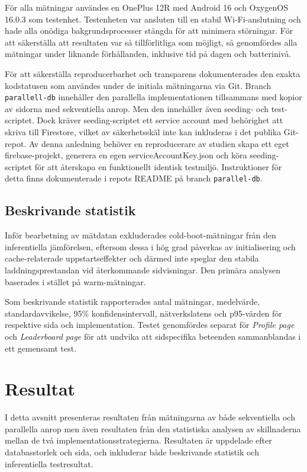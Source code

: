 \documentclass[letterpaper,twocolumn,10pt]{article}
\begin{document}
För alla mätningar användes en OnePlus 12R med Android 16 och OxygenOS 16.0.3
som testenhet. Testenheten var ansluten till en stabil Wi-Fi-anslutning och hade
alla onödiga bakgrundsprocesser stängda för att minimera störningar. För att
säkerställa att resultaten var så tillförlitliga som möjligt, så genomfördes
alla mätningar under liknande förhållanden, inklusive tid på dagen och
batterinivå. 

För att säkerställa reproducerbarhet och transparens dokumenterades den exakta
kodstatusen som användes under de initiala mätningarna via Git. Branch
\texttt{parallell-db} innehåller den parallella implementationen tillsammans med
kopior av sidorna med sekventiella anrop. Men den innehåller även seeding- och
test-scriptet. Dock kräver seeding-scriptet ett service account med behörighet
att skriva till Firestore, vilket av säkerhetsskäl inte kan inkluderas i det
publika Git-repot. Av denna anledning behöver en reproducerare av studien skapa
ett eget firebase-projekt, generera en egen serviceAccountKey.json och köra
seeding-scriptet för att återskapa en funktionellt identisk testmiljö.
Instruktioner för detta finns dokumenterade i repots README på branch
\texttt{parallel-db}.

\subsection{Beskrivande statistik}
Inför bearbetning av mätdatan exkluderades cold-boot-mätningar från den inferentiella
jämförelsen, eftersom dessa i hög grad påverkas av initialisering och
cache-relaterade uppstartseffekter och därmed inte speglar den stabila
laddningsprestandan vid återkommande sidvisningar. Den primära analysen
baserades i stället på warm-mätningar. 

Som beskrivande statistik rapporterades antal mätningar, medelvärde,
standardavvikelse, 95\% konfidensintervall, nätverkslatens och p95-värden för respektive sida och implementation.  Testet genomfördes separat för \textit{Profile page} och
\textit{Leaderboard page} för att undvika att sidspecifika beteenden
sammanblandas i ett gemensamt test. 
\section{Resultat}

I detta avsnitt presenteras resultaten från mätningarna av både sekventiella och
parallella anrop men även resultaten från den statistiska analysen av
skillnaderna mellan de två implementationsstrategierna. Resultaten är uppdelade efter databasstorlek och sida, och inkluderar både beskrivande statistik och inferentiella testresultat.
\end{document}
